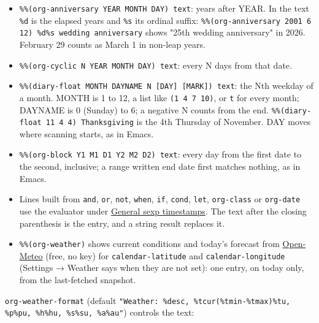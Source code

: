 \documentclass[11pt]{article}
\begin{document}
\begin{itemize}
\item \texttt{\%\%(org-anniversary YEAR MONTH DAY) text}: years after YEAR. In the text \texttt{\%d} is the elapsed years and \texttt{\%s} its ordinal suffix: \texttt{\%\%(org-anniversary 2001 6 12) \%d\%s wedding anniversary} shows "25th wedding anniversary" in 2026. February 29 counts as March 1 in non-leap years.
\item \texttt{\%\%(org-cyclic N YEAR MONTH DAY) text}: every N days from that date.
\item \texttt{\%\%(diary-float MONTH DAYNAME N [DAY] [MARK]) text}: the Nth weekday of a month. MONTH is 1 to 12, a list like \texttt{(1 4 7 10)}, or \texttt{t} for every month; DAYNAME is 0 (Sunday) to 6; a negative N counts from the end. \texttt{\%\%(diary-float 11 4 4) Thanksgiving} is the 4th Thursday of November. DAY moves where scanning starts, as in Emacs.
\item \texttt{\%\%(org-block Y1 M1 D1 Y2 M2 D2) text}: every day from the first date to the second, inclusive; a range written end date first matches nothing, as in Emacs.
\item Lines built from \texttt{and}, \texttt{or}, \texttt{not}, \texttt{when}, \texttt{if}, \texttt{cond}, \texttt{let}, \texttt{org-class} or \texttt{org-date} use the evaluator under \hyperref[sec:orgfd4eb7b]{General sexp timestamps}. The text after the closing parenthesis is the entry, and a string result replaces it.
\item \texttt{\%\%(org-weather)} shows current conditions and today's forecast from \href{https://open-meteo.com/}{Open-Meteo} (free, no key) for \texttt{calendar-latitude} and \texttt{calendar-longitude} (Settings → Weather says when they are not set): one entry, on today only, from the last-fetched snapshot.
\end{itemize}

\texttt{org-weather-format} (default \texttt{"Weather: \%desc, \%tcur(\%tmin-\%tmax)\%tu, \%p\%pu, \%h\%hu, \%s\%su, \%a\%au"}) controls the text:
\end{document}

